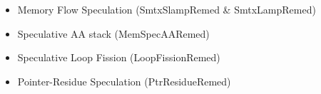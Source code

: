 \begin{itemize}


    \item Memory Flow Speculation (SmtxSlampRemed & SmtxLampRemed)

    \item Speculative AA stack (MemSpecAARemed)

    \item Speculative Loop Fission (LoopFissionRemed)

    \item Pointer-Residue Speculation (PtrResidueRemed)
\end{itemize}

